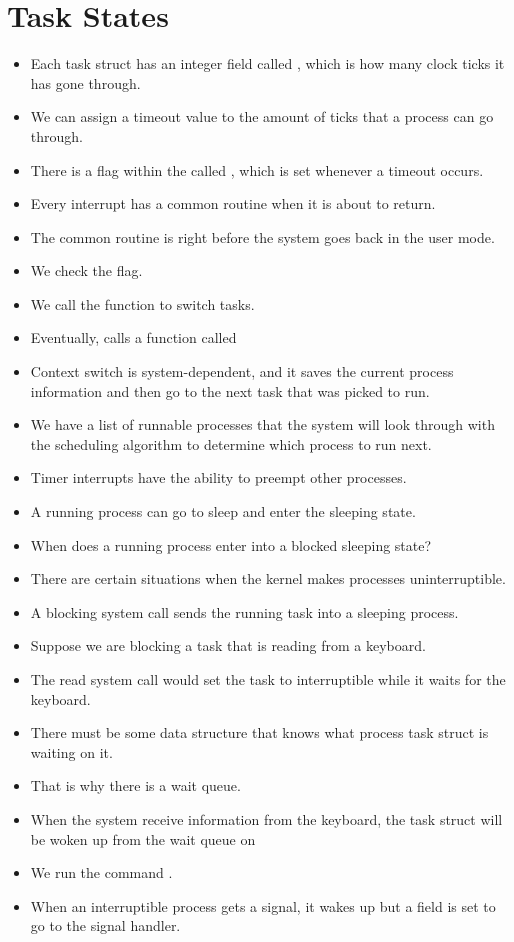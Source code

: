 \documentclass[]{article}
\begin{document}
\section{Task States}
\begin{itemize}
\item Each task struct has an integer field called , which is how
many clock ticks it has gone through.
\item We can assign a timeout value to the amount of ticks that a process can go
through.
\item There is a flag within the  called
, which is set whenever a timeout occurs.
\item Every interrupt has a common routine when it is about to return.
\item The common routine is right before the system goes back in the user mode.
\item We check the  flag.
\item We call the function  to switch tasks.
\item Eventually,  calls a function called
\item Context switch is system-dependent, and it saves the current process
information and then go to the next task that was picked to run.
\item We have a list of runnable processes that the system will look through
with the scheduling algorithm to determine which process to run next.
\item Timer interrupts have the ability to preempt other processes.
\item A running process can go to sleep and enter the sleeping state.
\item When does a running process enter into a blocked sleeping state?
\item There are certain situations when the kernel makes processes
uninterruptible.
\item A blocking system call sends the running task into a sleeping process.
\item Suppose we are blocking a task that is reading from a keyboard.
\item The read system call would set the task to interruptible while it waits
for the keyboard.
\item There must be some data structure that knows what process task struct is
waiting on it.
\item That is why there is a wait queue.
\item When the system receive information from the keyboard, the task struct
will be woken up from the wait queue on 
\item We run the command .
\item When an interruptible process gets a signal, it wakes up but a field is
set to go to the signal handler.
\end{itemize}
\end{document}
